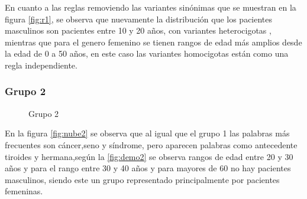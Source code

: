 En cuanto a las reglas removiendo las variantes sinónimas que se muestran en la figura  \ref{fig:r1}, se observa que  nuevamente la distribución que los pacientes masculinos son pacientes entre 10 y 20 años, con variantes heterocigotas , mientras que para el genero femenino se tienen rangos de edad más amplios desde la edad  de 0 a 50 años, en este caso las variantes homocigotas están como una regla independiente.\\

\subsubsection*{Grupo 2}

\begin{figure}[H]
	\centering
	\caption{Grupo 2} \label{fig:c2}
\end{figure}

En la figura \ref{fig:nube2} se observa que al igual que el grupo 1 las palabras más frecuentes son cáncer,seno y síndrome, pero aparecen palabras como antecedente tiroides y hermana,según la \ref{fig:demo2} se observa rangos de edad entre 20 y 30 años y para el rango entre 30 y 40 años y para mayores de 60 no hay pacientes masculinos, siendo este un grupo representado principalmente por pacientes femeninas.  

